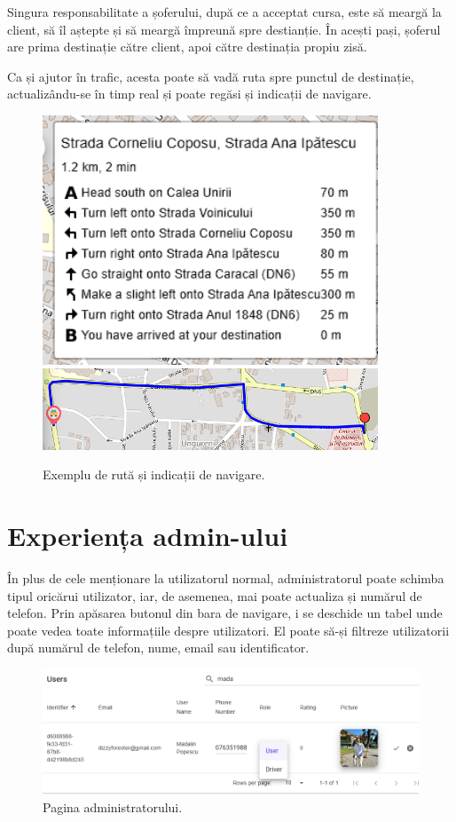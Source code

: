 Singura responsabilitate a șoferului, după ce a acceptat cursa, este să meargă la client, să îl aștepte și să
meargă împreună spre destianție. În acești pași, șoferul are prima destinație către client, apoi către destinația propiu zisă.

Ca și ajutor în trafic, acesta poate să vadă ruta spre punctul de destinație, actualizându-se în timp real și poate regăsi și
indicații de navigare.

\begin{figure}[H]
    \centering
    \includegraphics[width=10cm]{Assets/indicates.png}
    \includegraphics[width=10cm]{Assets/route.png}
    \caption{Exemplu de rută și indicații de navigare.}
    \label{fig:indicates}
\end{figure}

\section{Experiența admin-ului}

În plus de cele menționare la utilizatorul normal, administratorul poate schimba tipul 
oricărui utilizator, iar, de asemenea, mai poate actualiza și numărul de telefon.
Prin apăsarea butonul din bara de navigare, i se deschide un tabel unde poate vedea toate informațiile despre utilizatori.
El poate să-și filtreze utilizatorii după numărul de telefon, nume, email sau identificator.
\begin{figure}[H]
    \centering
    \includegraphics[width=16cm]{Assets/adminPage.png}
    \caption{Pagina administratorului.}
    \label{fig:adminPage}
\end{figure}

